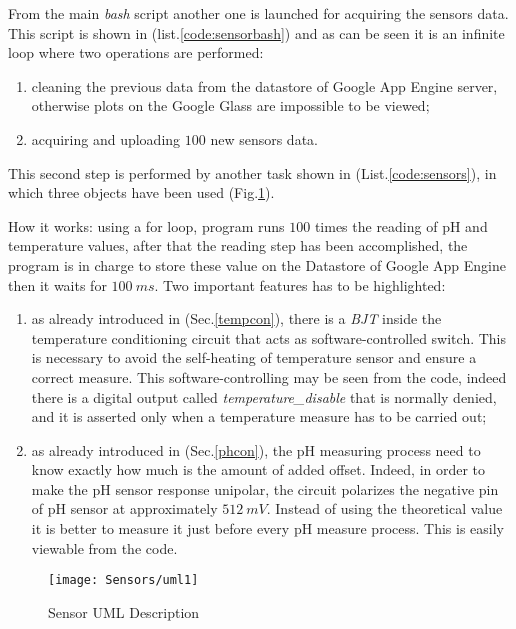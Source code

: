 From the main \textit{bash} script another one is launched for acquiring the sensors data. This script is shown in (list.\ref{code:sensorbash}) and as can be seen it is an infinite loop where two operations are performed:
\begin{enumerate}
	\item cleaning the previous data from the datastore of Google App Engine server, otherwise plots on the Google Glass are impossible to be viewed;
	\item acquiring and uploading $100$ new sensors data. 
\end{enumerate} 

This second step is performed by another task shown in (List.\ref{code:sensors}), in which three objects have been used (Fig.\ref{Fig:umlsensors}). 

How it works: using a for loop, program runs $100$ times the reading of pH and temperature values, after that the reading step has been accomplished, the program is in charge to store these value on the Datastore of Google App Engine then it waits for $100\ ms$. Two important features has to be highlighted:
\begin{enumerate}
	\item as already introduced in (Sec.\ref{tempcon}), there is a \textit{BJT} inside the temperature conditioning circuit that acts as software-controlled switch. This is necessary to avoid the self-heating of temperature sensor and ensure a correct measure. This software-controlling may be seen from the code, indeed there is a digital output called \textit{temperature\_disable} that is normally denied, and it is asserted only when a temperature measure has to be carried out;
	\item as already introduced in (Sec.\ref{phcon}), the pH measuring process need to know exactly how much is the amount of added offset. Indeed, in order to make the pH sensor response unipolar, the circuit polarizes the negative pin of pH sensor at approximately $512\ mV$. Instead of using the theoretical value it is better to measure it just before every pH measure process. This is easily viewable from the code. 
\end{enumerate}   

\begin{figure}[h]
	\centering
	\texttt{[image: Sensors/uml1]}
	\caption{Sensor UML Description}
	\label{Fig:umlsensors}
	
\end{figure}

